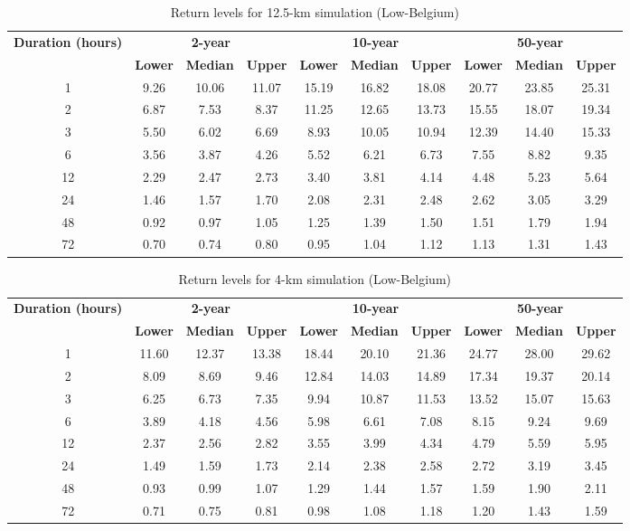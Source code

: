 \begin{table}[p]
\centering
\caption{Return levels for 12.5-km simulation (Low-Belgium)}
\label{tab:observations}
\begin{tabular}{c||ccc||ccc||ccc}
\hline
\textbf{Duration (hours)} & \multicolumn{3}{c||}{\textbf{2-year}} & \multicolumn{3}{c||}{\textbf{10-year}} & \multicolumn{3}{c}{\textbf{50-year}} \\
\cline{2-10}
& \textbf{Lower} & \textbf{Median} & \textbf{Upper} & \textbf{Lower} & \textbf{Median} & \textbf{Upper} & \textbf{Lower} & \textbf{Median} & \textbf{Upper} \\
\hline
1 & 9.26 & 10.06 & 11.07 & 15.19 & 16.82 & 18.08 & 20.77 & 23.85 & 25.31 \\
2 & 6.87 & 7.53 & 8.37 & 11.25 & 12.65 & 13.73 & 15.55 & 18.07 & 19.34 \\
3 & 5.50 & 6.02 & 6.69 & 8.93 & 10.05 & 10.94 & 12.39 & 14.40 & 15.33 \\
6 & 3.56 & 3.87 & 4.26 & 5.52 & 6.21 & 6.73 & 7.55 & 8.82 & 9.35 \\
12 & 2.29 & 2.47 & 2.73 & 3.40 & 3.81 & 4.14 & 4.48 & 5.23 & 5.64 \\
24 & 1.46 & 1.57 & 1.70 & 2.08 & 2.31 & 2.48 & 2.62 & 3.05 & 3.29 \\
48 & 0.92 & 0.97 & 1.05 & 1.25 & 1.39 & 1.50 & 1.51 & 1.79 & 1.94 \\
72 & 0.70 & 0.74 & 0.80 & 0.95 & 1.04 & 1.12 & 1.13 & 1.31 & 1.43 \\
\hline
\end{tabular}
\end{table}

\begin{table}[p]
\centering
\caption{Return levels for 4-km simulation (Low-Belgium)}
\label{tab:observations}
\begin{tabular}{c||ccc||ccc||ccc}
\hline
\textbf{Duration (hours)} & \multicolumn{3}{c||}{\textbf{2-year}} & \multicolumn{3}{c||}{\textbf{10-year}} & \multicolumn{3}{c}{\textbf{50-year}} \\
\cline{2-10}
& \textbf{Lower} & \textbf{Median} & \textbf{Upper} & \textbf{Lower} & \textbf{Median} & \textbf{Upper} & \textbf{Lower} & \textbf{Median} & \textbf{Upper} \\
\hline
1 & 11.60 & 12.37 & 13.38 & 18.44 & 20.10 & 21.36 & 24.77 & 28.00 & 29.62 \\
2 & 8.09 & 8.69 & 9.46 & 12.84 & 14.03 & 14.89 & 17.34 & 19.37 & 20.14 \\
3 & 6.25 & 6.73 & 7.35 & 9.94 & 10.87 & 11.53 & 13.52 & 15.07 & 15.63 \\
6 & 3.89 & 4.18 & 4.56 & 5.98 & 6.61 & 7.08 & 8.15 & 9.24 & 9.69 \\
12 & 2.37 & 2.56 & 2.82 & 3.55 & 3.99 & 4.34 & 4.79 & 5.59 & 5.95 \\
24 & 1.49 & 1.59 & 1.73 & 2.14 & 2.38 & 2.58 & 2.72 & 3.19 & 3.45 \\
48 & 0.93 & 0.99 & 1.07 & 1.29 & 1.44 & 1.57 & 1.59 & 1.90 & 2.11 \\
72 & 0.71 & 0.75 & 0.81 & 0.98 & 1.08 & 1.18 & 1.20 & 1.43 & 1.59 \\
\hline
\end{tabular}
\end{table}


